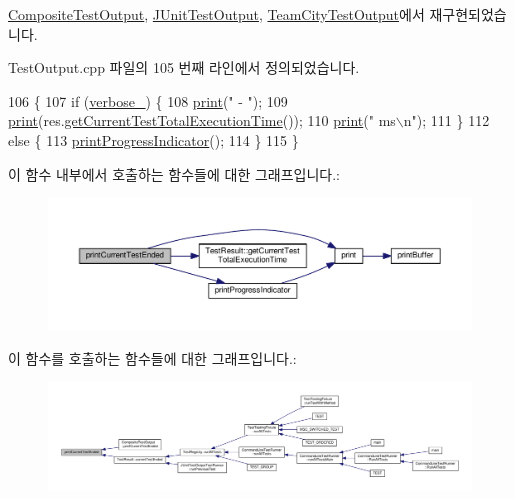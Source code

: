 \hyperlink{class_composite_test_output_a67acd3c53695126b4728c7da0d2b0b51}{Composite\+Test\+Output}, \hyperlink{class_j_unit_test_output_a03ceb1aab29f845f5d0a6e5bb4124885}{J\+Unit\+Test\+Output}, \hyperlink{class_team_city_test_output_a03ceb1aab29f845f5d0a6e5bb4124885}{Team\+City\+Test\+Output}에서 재구현되었습니다.



Test\+Output.\+cpp 파일의 105 번째 라인에서 정의되었습니다.


\begin{DoxyCode}
106 \{
107     \textcolor{keywordflow}{if} (\hyperlink{class_test_output_a86126da532c138842a42d8e9a52b0806}{verbose\_}) \{
108         \hyperlink{class_test_output_a321b5c489a90374cb61c34fe5d2253ef}{print}(\textcolor{stringliteral}{" - "});
109         \hyperlink{class_test_output_a321b5c489a90374cb61c34fe5d2253ef}{print}(res.\hyperlink{class_test_result_a3c06bb4516065fd2ba57231e246002e9}{getCurrentTestTotalExecutionTime}());
110         \hyperlink{class_test_output_a321b5c489a90374cb61c34fe5d2253ef}{print}(\textcolor{stringliteral}{" ms\(\backslash\)n"});
111     \}
112     \textcolor{keywordflow}{else} \{
113         \hyperlink{class_test_output_a0cd44d3b6da1caa7b8d335ef7580a391}{printProgressIndicator}();
114     \}
115 \}
\end{DoxyCode}


이 함수 내부에서 호출하는 함수들에 대한 그래프입니다.\+:
\nopagebreak
\begin{figure}[H]
\begin{center}
\leavevmode
\includegraphics[width=350pt]{class_test_output_a67acd3c53695126b4728c7da0d2b0b51_cgraph}
\end{center}
\end{figure}




이 함수를 호출하는 함수들에 대한 그래프입니다.\+:
\nopagebreak
\begin{figure}[H]
\begin{center}
\leavevmode
\includegraphics[width=350pt]{class_test_output_a67acd3c53695126b4728c7da0d2b0b51_icgraph}
\end{center}
\end{figure}


